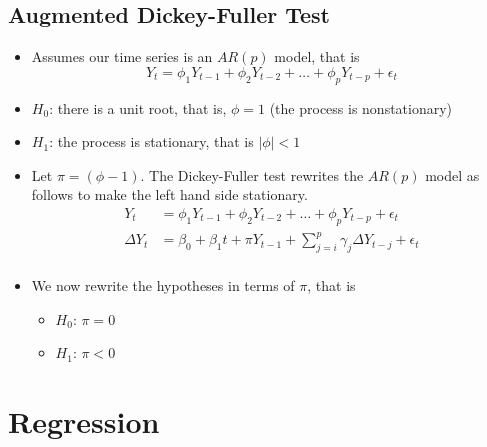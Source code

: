 \documentclass[11pt]{article}
\begin{document}
\subsection{Augmented Dickey-Fuller Test}
\begin{itemize}
    \item Assumes our time series is an $AR(p)$ model, that is 
    \[Y_t = \phi_1 Y_{t-1} + \phi_2 Y_{t-2} + \hdots + \phi_p Y_{t-p} + \epsilon_t\]
    \item $H_0$: there is a unit root, that is, $\phi = 1$ (the process is nonstationary)
    \item $H_1$: the process is stationary, that is $|\phi|<1$
    \item Let $\pi = (\phi - 1)$. The Dickey-Fuller test rewrites the $AR(p)$ model as follows
    to make the left hand side stationary.
    \begin{align*}
        Y_t &= \phi_1 Y_{t-1} + \phi_2 Y_{t-2} + \hdots + \phi_p Y_{t-p} + \epsilon_t \\
        \Delta Y_t &= \beta_0 + \beta_1 t + \pi Y_{t-1} + \sum_{j=i}^{p} \gamma_j \Delta Y_{t-j} + \epsilon_t \\
    \end{align*}
    \item We now rewrite the hypotheses in terms of $\pi$, that is 
    \begin{itemize}
        \item $H_0$: $\pi = 0$
        \item $H_1$: $\pi < 0$
    \end{itemize}
\end{itemize}

\section{Regression}
\end{document}
